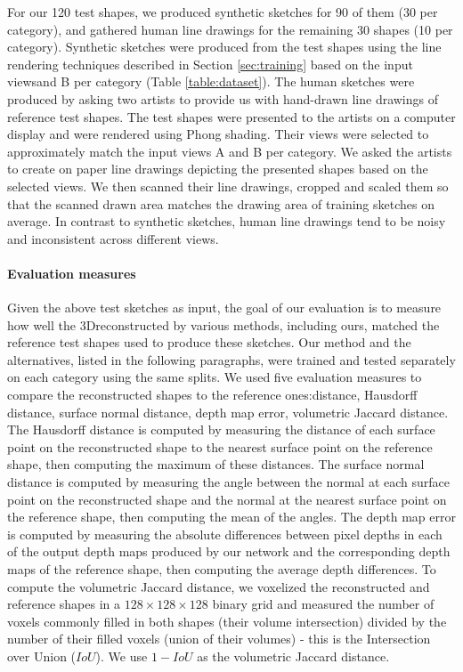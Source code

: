 \documentclass[10pt, conference, compsocconf]{IEEEtran}
\begin{document}
For our 120 test shapes, we produced synthetic sketches for 90 of them (30 per category), and gathered human line drawings for the remaining 30 shapes (10 per category).  Synthetic sketches were produced from  the  test shapes using the line rendering techniques described in Section \ref{sec:training} based on the input views\A and B  per category (Table \ref{table:dataset}). The human sketches were produced by asking two artists to provide us with hand-drawn line drawings of  reference test shapes.
The test shapes were presented to the artists on a computer display and were rendered using Phong shading. Their views were selected to approximately match the input views A and B per category. We asked the artists to create on paper line drawings  depicting the  presented shapes based on  the selected views.  We then scanned their line drawings, cropped and scaled them so that the scanned drawn area  matches the drawing area of training sketches on average.
In contrast to synthetic sketches, human line drawings tend to be noisy and inconsistent across different views.

\vspace{-1mm}\paragraph{Evaluation measures} Given the above test  sketches as input, the goal of our evaluation is to measure how well the 3D\shapes reconstructed by various methods, including ours, matched the  reference test shapes used to produce these sketches. Our method and the alternatives, listed in the following paragraphs, were trained and tested separately on each  category using the same splits.  We used five evaluation measures to compare the reconstructed shapes to the reference ones:\Chamfer distance, Hausdorff distance, surface normal distance,  depth map error, volumetric Jaccard distance. 
The Hausdorff distance is computed by measuring the distance of each surface point on the reconstructed shape  to the nearest surface point on the reference shape, then computing the maximum of  these distances.
The surface normal distance 
is computed by measuring the angle between the  normal at each surface point on the reconstructed shape and the  normal  at the nearest surface point on the reference shape, then computing the  mean of the angles. 
The depth map error is computed by measuring the absolute differences between pixel depths in each of the output depth maps produced by our network and the corresponding depth maps of the reference shape, then  computing the average depth differences. To compute the volumetric Jaccard distance, we voxelized the reconstructed and reference shapes in a $128 \times 128 \times 128$ binary grid and measured the number of  voxels commonly filled in both shapes (their volume intersection) divided by the number of  their filled voxels (union of their volumes) - this is the Intersection over Union ($IoU$). We use $1-IoU$ as the volumetric Jaccard distance. 
\end{document}
